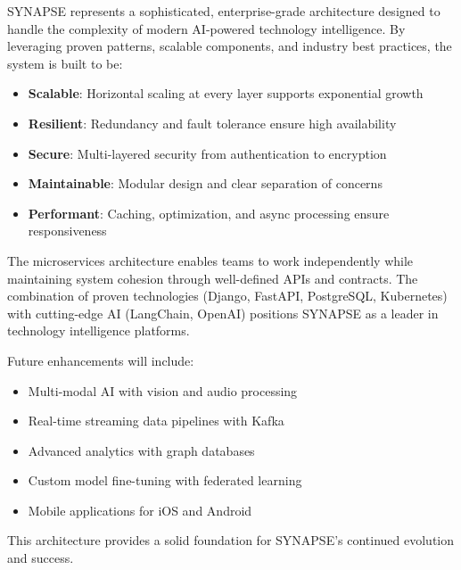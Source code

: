 \documentclass[12pt,a4paper]{report}
\begin{document}
SYNAPSE represents a sophisticated, enterprise-grade architecture designed to handle the complexity of modern AI-powered technology intelligence. By leveraging proven patterns, scalable components, and industry best practices, the system is built to be:

\begin{itemize}[label=\textbullet]
    \item \textbf{Scalable}: Horizontal scaling at every layer supports exponential growth
    \item \textbf{Resilient}: Redundancy and fault tolerance ensure high availability
    \item \textbf{Secure}: Multi-layered security from authentication to encryption
    \item \textbf{Maintainable}: Modular design and clear separation of concerns
    \item \textbf{Performant}: Caching, optimization, and async processing ensure responsiveness
\end{itemize}

The microservices architecture enables teams to work independently while maintaining system cohesion through well-defined APIs and contracts. The combination of proven technologies (Django, FastAPI, PostgreSQL, Kubernetes) with cutting-edge AI (LangChain, OpenAI) positions SYNAPSE as a leader in technology intelligence platforms.

Future enhancements will include:

\begin{itemize}[label=\textbullet]
    \item Multi-modal AI with vision and audio processing
    \item Real-time streaming data pipelines with Kafka
    \item Advanced analytics with graph databases
    \item Custom model fine-tuning with federated learning
    \item Mobile applications for iOS and Android
\end{itemize}

This architecture provides a solid foundation for SYNAPSE's continued evolution and success.


\newpage
\end{document}
